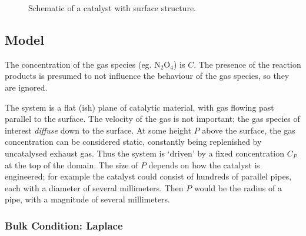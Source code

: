 \documentclass[12pt, a4paper, twoside, openright]{book}
\begin{document}
\begin{figure}[ht]
\centering
{}
\caption{Schematic of a catalyst with surface structure.}\label{catalyst}
\end{figure}

\subsection{Model}

The concentration of the gas species (eg. N$_2$O$_4$) is $C$.  The presence of the reaction products is presumed to not influence the behaviour of the gas species, so they are ignored.
\vspace*{1em}

The system is a flat (ish) plane of catalytic material, with gas flowing past parallel to the surface.  The velocity of the gas is not important; the gas species of interest \emph{diffuse} down to the surface.  At some height $P$ above the surface, the gas concentration can be considered static, constantly being replenished by uncatalysed exhaust gas.  Thus the system is `driven' by a fixed concentration $C_P$ at the top of the domain.  The size of $P$ depends on how the catalyst is engineered; for example the catalyst could consist of hundreds of parallel pipes, each with a diameter of several millimeters.  Then $P$ would be the radius of a pipe, with a magnitude of several millimeters.



\subsubsection{Bulk Condition: Laplace}
\end{document}
